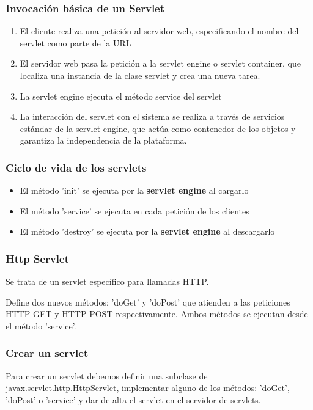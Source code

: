 \documentclass{apuntes}
\begin{document}
\subsubsection{Invocación básica de un Servlet}
\begin{enumerate}
\item El cliente realiza una petición al servidor web, especificando el nombre del servlet como parte de la URL
\item El servidor web pasa la petición a la servlet engine o servlet container, que localiza una instancia de la clase servlet y crea una nueva tarea.
\item La servlet engine ejecuta el método service del servlet
\item La interacción del servlet con el sistema se realiza a través de servicios estándar de la servlet engine, que actúa como contenedor de los objetos y garantiza la independencia de la plataforma.
\end{enumerate}

\subsubsection{Ciclo de vida de los servlets}
\begin{itemize}
\item El método 'init' se ejecuta por la \textbf{servlet engine} al cargarlo
\item El método 'service' se ejecuta en cada petición de los clientes
\item El método 'destroy' se ejecuta por la \textbf{servlet engine} al descargarlo
\end{itemize}

\subsubsection{Http Servlet}
Se trata de un servlet específico para llamadas HTTP.

Define dos nuevos métodos: 'doGet' y 'doPost' que atienden a las peticiones HTTP GET y HTTP POST respectivamente. Ambos métodos se ejecutan desde el método 'service'.

\subsubsection{Crear un servlet}
Para crear un servlet debemos definir una subclase de javax.servlet.http.HttpServlet, implementar alguno de los métodos: 'doGet', 'doPost' o 'service' y dar de alta el servlet en el servidor de servlets.
\end{document}
